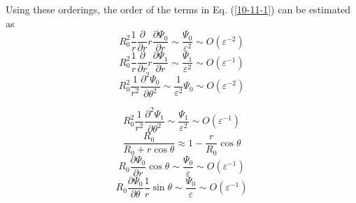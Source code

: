 \documentclass{llncs}
\begin{document}
Using these orderings, the order of the terms in Eq. (\ref{10-11-1}) can be
estimated as
\begin{equation}
  R_0^2 \frac{1}{r}  \frac{\partial}{\partial r} r \frac{\partial
  \Psi_0}{\partial r} \sim \frac{\Psi_0}{\varepsilon^2} \sim O (\varepsilon^{-
  2})
\end{equation}
\begin{equation}
  R_0^2 \frac{1}{r}  \frac{\partial}{\partial r} r \frac{\partial
  \Psi_1}{\partial r} \sim \frac{\Psi_1}{\varepsilon^2} \sim O (\varepsilon^{-
  1})
\end{equation}
\begin{equation}
  R_0^2 \frac{1}{r^2}  \frac{\partial^2 \Psi_0}{\partial \theta^2} \sim
  \frac{1}{\varepsilon^2} \Psi_0 \sim O (\varepsilon^{- 2})
\end{equation}

\begin{equation}
  R_0^2 \frac{1}{r^2}  \frac{\partial^2 \Psi_1}{\partial \theta^2} \sim
  \frac{\Psi_1}{\varepsilon^2} \sim O (\varepsilon^{- 1})
\end{equation}
\begin{equation}
  \frac{R_0}{R_0 + r \cos \theta} \approx 1 - \frac{r}{R_0} \cos \theta
\end{equation}
\begin{equation}
  R_0  \frac{\partial \Psi_0}{\partial r} \cos \theta \sim
  \frac{\Psi_0}{\varepsilon} \sim O (\varepsilon^{- 1})
\end{equation}
\begin{equation}
  R_0  \frac{\partial \Psi_0}{\partial \theta}  \frac{1}{r} \sin \theta \sim
  \frac{\Psi_0}{\varepsilon} \sim O (\varepsilon^{- 1})
\end{equation}
\end{document}
